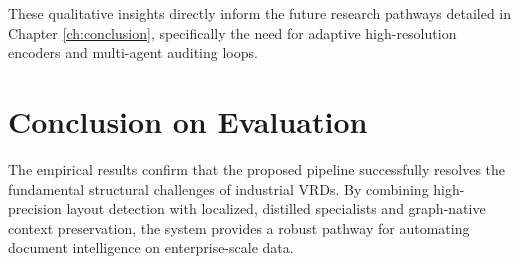 These qualitative insights directly inform the future research pathways detailed in Chapter \ref{ch:conclusion}, specifically the need for adaptive high-resolution encoders and multi-agent auditing loops.

\section{Conclusion on Evaluation}
The empirical results confirm that the proposed pipeline successfully resolves the fundamental structural challenges of industrial VRDs. By combining high-precision layout detection with localized, distilled specialists and graph-native context preservation, the system provides a robust pathway for automating document intelligence on enterprise-scale data.
